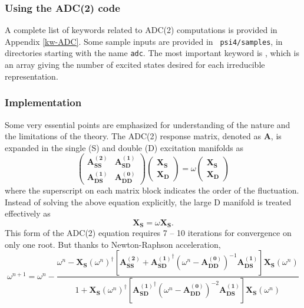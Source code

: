 \subsubsection{Using the ADC(2) code}
A complete list of keywords related to ADC(2) computations is provided in
Appendix \ref{kw-ADC}.  Some sample inputs are provided in {\tt
psi4/samples}, in directories starting with the name {\tt adc}.  The most
important keyword is , which is an array
giving the number of excited states desired for each irreducible
representation.

\subsubsection{Implementation}
Some very essential points are emphasized for understanding of the
nature and the limitations of the theory. The ADC(2) response matrix,
denoted as $\mathbf{A}$, is expanded in the single (S) and double (D)
excitation manifolds as
\begin{equation*}
\begin{pmatrix}
\mathbf{A_{SS}^{(2)}} & \mathbf{A_{SD}^{(1)}}\\
\mathbf{A_{DS}^{(1)}} & \mathbf{A_{DD}^{(0)}}
\end{pmatrix}
\begin{pmatrix}
\mathbf{X_S}\\
\mathbf{X_D}
\end{pmatrix}
=\omega
\begin{pmatrix}
\mathbf{X_S}\\
\mathbf{X_D}
\end{pmatrix}
\end{equation*}
where the superscript on each matrix block indicates the order of
the fluctuation. Instead of solving the above equation explicitly,
the large D manifold is treated effectively as
\begin{equation*}
[\mathbf{A_{SS}^{(2)}}+\mathbf{A_{SD}^{(1)}}^{\dagger}(\omega-\mathbf{A_{DD}^{(0)}})^{-1}\mathbf{A_{DS}^{(1)}}]\mathbf{X_{S}}=\omega\mathbf{X_{S}}.
\end{equation*}
This form of the ADC(2) equation requires 7 -- 10 iterations for
convergence on only one root. But thanks to Newton-Raphson
acceleration,
\begin{equation*}
\omega^{n+1}=\omega^{n}-\frac{\omega^n-\mathbf{X_{S}}(\omega^n)^{\dagger}[\mathbf{A_{SS}^{(2)}}+\mathbf{A_{SD}^{(1)}}^{\dagger}(\omega^n-\mathbf{A_{DD}^{(0)}})^{-1}\mathbf{A_{DS}^{(1)}}]\mathbf{X_{S}}(\omega^n)}{1+\mathbf{X_{S}}(\omega^n)^{\dagger}[\mathbf{A_{SD}^{(1)}}^{\dagger}(\omega^n-\mathbf{A_{DD}^{(0)}})^{-2}\mathbf{A_{DS}^{(1)}}]\mathbf{X_{S}}(\omega^n)}
\end{equation*}
